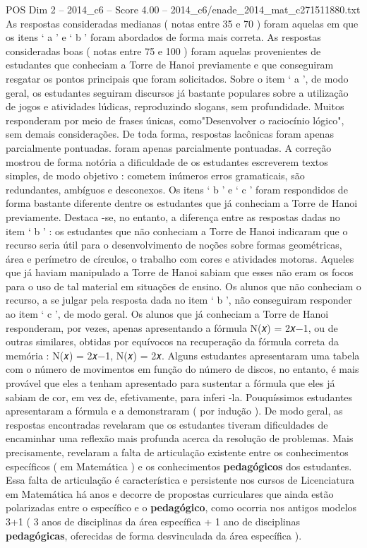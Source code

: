 \begin{textsample}{POS Dim 2 – 2014\_c6 – Score 4.00 – 2014\_c6/enade\_2014\_mat\_c271511880.txt}
As respostas consideradas medianas ( notas entre 35 e 70 ) foram aquelas em que os itens ‘ a ’ e ‘ b ’ foram abordados de forma mais correta.
As respostas consideradas boas ( notas entre 75 e 100 ) foram aquelas provenientes de estudantes que conheciam a Torre de Hanoi previamente e que conseguiram resgatar os pontos principais que foram solicitados.
Sobre o item ‘ a ’, de modo geral, os estudantes seguiram discursos já bastante populares sobre a utilização de jogos e atividades lúdicas, reproduzindo slogans, sem profundidade.
Muitos responderam por meio de frases únicas, como"Desenvolver o raciocínio lógico", sem demais considerações.
De toda forma, respostas lacônicas foram apenas parcialmente pontuadas. foram apenas parcialmente pontuadas.
A correção mostrou de forma notória a dificuldade de os estudantes escreverem textos simples, de modo objetivo : cometem inúmeros erros gramaticais, são redundantes, ambíguos e desconexos.
Os itens ‘ b ’ e ‘ c ’ foram respondidos de forma bastante diferente dentre os estudantes que já conheciam a Torre de Hanoi previamente.
Destaca -se, no entanto, a diferença entre as respostas dadas no item ‘ b ’ : os estudantes que não conheciam a Torre de Hanoi indicaram que o recurso seria útil para o desenvolvimento de noções sobre formas geométricas, área e perímetro de círculos, o trabalho com cores e atividades motoras.
Aqueles que já haviam manipulado a Torre de Hanoi sabiam que esses não eram os focos para o uso de tal material em situações de ensino.
Os alunos que não conheciam o recurso, a se julgar pela resposta dada no item ‘ b ’, não conseguiram responder ao item ‘ c ’, de modo geral.
Os alunos que já conheciam a Torre de Hanoi responderam, por vezes, apenas apresentando a fórmula N(𝑥) = 2𝑥−1, ou de outras similares, obtidas por equívocos na recuperação da fórmula correta da memória : N(𝑥) = 2𝑥−1, N(𝑥) = 2𝑥.
Alguns estudantes apresentaram uma tabela com o número de movimentos em função do número de discos, no entanto, é mais provável que eles a tenham apresentado para sustentar a fórmula que eles já sabiam de cor, em vez de, efetivamente, para inferi -la.
Pouquíssimos estudantes apresentaram a fórmula e a demonstraram ( por indução ).
De modo geral, as respostas encontradas revelaram que os estudantes tiveram dificuldades de encaminhar uma reflexão mais profunda acerca da resolução de problemas.
Mais precisamente, revelaram a falta de articulação existente entre os conhecimentos específicos ( em Matemática ) e os conhecimentos \textbf{pedagógicos} dos estudantes.
Essa falta de articulação é característica e persistente nos cursos de Licenciatura em Matemática há anos e decorre de propostas curriculares que ainda estão polarizadas entre o específico e o \textbf{pedagógico}, como ocorria nos antigos modelos 3+1 ( 3 anos de disciplinas da área específica + 1 ano de disciplinas \textbf{pedagógicas}, oferecidas de forma desvinculada da área específica ).

\end{textsample}
